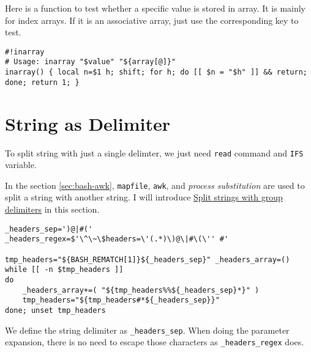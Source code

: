 Here is a function to test whether a specific value is stored in
array. It is mainly for index arrays. If it is an associative
array, just use the corresponding key to test.

\begin{lstlisting}
#!inarray
# Usage: inarray "$value" "${array[@]}"
inarray() { local n=$1 h; shift; for h; do [[ $n = "$h" ]] && return; done; return 1; }
\end{lstlisting}

\section{String as Delimiter}
\label{sec:bash-str-as-delim}

To split string with just a single delimter, we just need
\lstinline|read| command and \lstinline|IFS| variable.

In the section \ref{sec:bash-awk}, \lstinline|mapfile|,
\lstinline{awk}, and \textit{process substitution} are used to
split a string with another string. I will introduce
\href{https://www.tutorialkart.com/bash-shell-scripting/bash-split-string/#split-string-with-multiple-character-delimiter}{Split
  strings with group delimiters} in this section.

\begin{minipage}{1.0\linewidth}
\begin{lstlisting}
_headers_sep=')@|#('
_headers_regex=$'\^\~\$headers=\'(.*)\)@\|#\(\'' #'

tmp_headers="${BASH_REMATCH[1]}${_headers_sep}" _headers_array=()
while [[ -n $tmp_headers ]]
do
    _headers_array+=( "${tmp_headers%%${_headers_sep}*}" )
    tmp_headers="${tmp_headers#*${_headers_sep}}"
done; unset tmp_headers
\end{lstlisting}
\end{minipage}

We define the string delimiter as \lstinline|_headers_sep|. When
doing the parameter expansion, there is no need to escape those
characters as \lstinline|_headers_regex| does.









\lstset{language=TeX}

